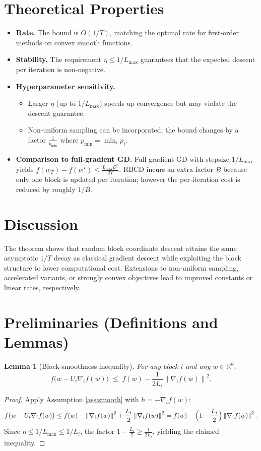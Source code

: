 \documentclass{article}
\newtheorem{lemma}{Lemma}
\newcommand{\RR}{\mathbb{R}}
\newcommand{\norm}[1]{\left\|#1\right\|}
\newcommand{\grad}[1]{\nabla_{#1}}
\begin{document}
\section*{Theoretical Properties}
\begin{itemize}[leftmargin=*]
\item \textbf{Rate.} The bound is $O(1/T)$, matching the optimal rate for
first‑order methods on convex smooth functions.
\item \textbf{Stability.} The requirement $\eta\le 1/L_{\max}$ guarantees that the
expected descent per iteration is non‑negative.
\item \textbf{Hyperparameter sensitivity.}
    \begin{itemize}
        \item Larger $\eta$ (up to $1/L_{\max}$) speeds up convergence but may violate
              the descent guarantee.
        \item Non‑uniform sampling can be incorporated; the bound changes by a factor
              $\frac{1}{p_{\min}}$ where $p_{\min}=\min_i p_i$.
    \end{itemize}
\item \textbf{Comparison to full‑gradient GD.}
    Full‑gradient GD with stepsize $1/L_{\max}$ yields
    $f(w_T)-f(w^{\star})\le \frac{L_{\max}D^{2}}{2T}$.
    RBCD incurs an extra factor $B$ because only one block is updated per
    iteration; however the per‑iteration cost is reduced by roughly $1/B$.
\end{itemize}

\section*{Discussion}
The theorem shows that random block coordinate descent attains the same
asymptotic $1/T$ decay as classical gradient descent while exploiting
the block structure to lower computational cost.  Extensions to
non‑uniform sampling, accelerated variants, or strongly convex objectives
lead to improved constants or linear rates, respectively.

\newpage

\section*{Preliminaries (Definitions and Lemmas)}
\begin{lemma}[Block‑smoothness inequality]\label{lem:smooth}
For any block $i$ and any $w\in\RR^{d}$,
\[
f\bigl(w-U_i\grad{i}f(w)\bigr)
\;\le\;
f(w)-\frac{1}{2L_i}\norm{\grad{i}f(w)}^{2}.
\]
\end{lemma}
\begin{proof}
Apply Assumption \ref{ass:smooth} with $h=-\grad{i}f(w)$:
\[
f\bigl(w-U_i\grad{i}f(w)\bigr)
\le f(w)-\norm{\grad{i}f(w)}^{2}
      +\frac{L_i}{2}\norm{\grad{i}f(w)}^{2}
= f(w)-\Bigl(1-\frac{L_i}{2}\Bigr)\norm{\grad{i}f(w)}^{2}.
\]
Since $\eta\le 1/L_{\max}\le 1/L_i$, the factor $1-\frac{L_i}{2}\ge
\frac{1}{2L_i}$, yielding the claimed inequality. \qedhere
\end{proof}
\end{document}

